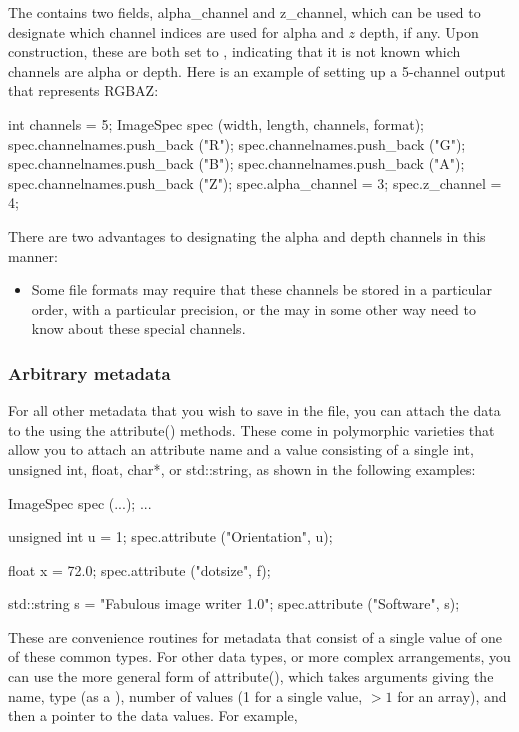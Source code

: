 The \ImageSpec contains two fields, {\cf alpha_channel} and {\cf
  z_channel}, which can be used to designate which channel indices are
used for alpha and $z$ depth, if any.  Upon construction, these are both
set to {}, indicating that it is not known which channels 
are alpha or depth.  Here is an example of setting up a 5-channel output
that represents RGBAZ:

\begin{code}
        int channels = 5;
        ImageSpec spec (width, length, channels, format);
        spec.channelnames.push_back ("R");
        spec.channelnames.push_back ("G");
        spec.channelnames.push_back ("B");
        spec.channelnames.push_back ("A");
        spec.channelnames.push_back ("Z");
        spec.alpha_channel = 3;
        spec.z_channel = 4;
\end{code}

There are two advantages to designating the alpha and depth channels in
this manner:  
\begin{itemize}
\item Some file formats may require that these channels be stored in a
  particular order, with a particular precision, or the \ImageOutput may
  in some other way need to know about these special channels.
\end{itemize}

\subsubsection{Arbitrary metadata}

For all other metadata that you wish to save in the file, you can attach
the data to the \ImageSpec using the {\cf attribute()} methods.
These come in polymorphic varieties that allow you to attach an
attribute name and a value consisting of a single {\cf int}, {\cf
  unsigned int}, {\cf float}, {\cf char*}, or {\cf std::string}, as
shown in the following examples:

\begin{code}
        ImageSpec spec (...);
        ...

        unsigned int u = 1;
        spec.attribute ("Orientation", u);

        float x = 72.0;
        spec.attribute ("dotsize", f);

        std::string s = "Fabulous image writer 1.0";
        spec.attribute ("Software", s);
\end{code}

These are convenience routines for metadata that consist of a single
value of one of these common types.  For other data types, or more
complex arrangements, you can use the more general form of {\cf
  attribute()}, which takes arguments giving the name, type (as a
\TypeDesc), number of values (1 for a single value, $>1$ for an
  array), and then a pointer to the data values.  For example,


